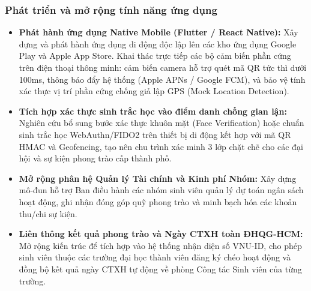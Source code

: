 \subsubsection{Phát triển và mở rộng tính năng ứng dụng}
\begin{itemize}[leftmargin=*]
    \item \textbf{Phát hành ứng dụng Native Mobile (Flutter / React Native):} Xây dựng và phát hành ứng dụng di động độc lập lên các kho ứng dụng Google Play và Apple App Store. Khai thác trực tiếp các bộ cảm biến phần cứng trên điện thoại thông minh: cảm biến camera hỗ trợ quét mã QR tức thì dưới 100ms, thông báo đẩy hệ thống (Apple APNs / Google FCM), và bảo vệ tính xác thực vị trí phần cứng chống giả lập GPS (Mock Location Detection).
    
    \item \textbf{Tích hợp xác thực sinh trắc học vào điểm danh chống gian lận:} Nghiên cứu bổ sung bước xác thực khuôn mặt (Face Verification) hoặc chuẩn sinh trắc học WebAuthn/FIDO2 trên thiết bị di động kết hợp với mã QR HMAC và Geofencing, tạo nên chu trình xác minh 3 lớp chặt chẽ cho các đại hội và sự kiện phong trào cấp thành phố.
    
    \item \textbf{Mở rộng phân hệ Quản lý Tài chính và Kinh phí Nhóm:} Xây dựng mô-đun hỗ trợ Ban điều hành các nhóm sinh viên quản lý dự toán ngân sách hoạt động, ghi nhận đóng góp quỹ phong trào và minh bạch hóa các khoản thu/chi sự kiện.
    
    \item \textbf{Liên thông kết quả phong trào và Ngày CTXH toàn ĐHQG-HCM:} Mở rộng kiến trúc để tích hợp vào hệ thống nhận diện số VNU-ID, cho phép sinh viên thuộc các trường đại học thành viên đăng ký chéo hoạt động và đồng bộ kết quả ngày CTXH tự động về phòng Công tác Sinh viên của từng trường.
\end{itemize}

